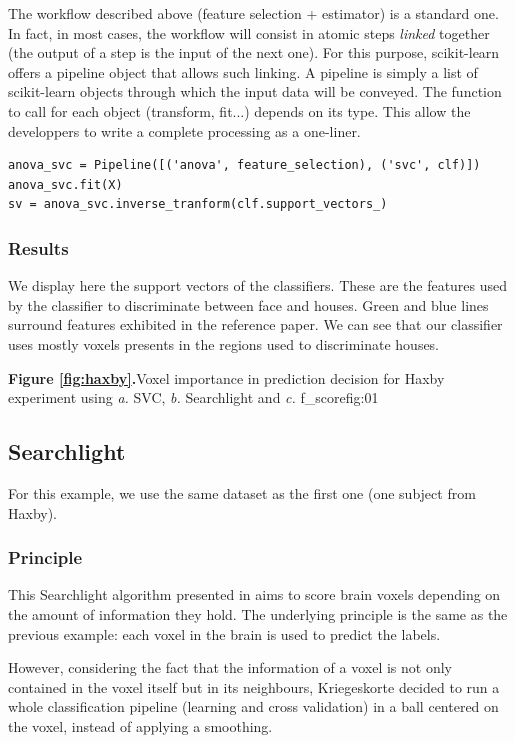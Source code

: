 \documentclass{frontiersSCNS} %
\begin{document}
The workflow described above (feature selection + estimator) is a standard one.
In fact, in most cases, the workflow will consist in atomic steps
\textit{linked} together (the output of a step is the input of the next one).
For this purpose, scikit-learn offers a pipeline object that allows such
linking. A pipeline is simply a list of scikit-learn objects through which the
input data will be conveyed. The function to call for each object (transform,
fit...) depends on its type.
This allow the developpers to write a complete processing as a one-liner.

\begin{lstlisting}
anova_svc = Pipeline([('anova', feature_selection), ('svc', clf)])
anova_svc.fit(X)
sv = anova_svc.inverse_tranform(clf.support_vectors_)
\end{lstlisting}

\subsubsection{Results}

We display here the support vectors of the classifiers. These are the features
used by the classifier to discriminate between face and houses. Green and blue
lines surround features exhibited in the reference paper. We can see that our
classifier uses mostly voxels presents in the regions used to discriminate
houses.

\textbf{Figure \ref{fig:haxby}.}{Voxel importance in prediction decision for Haxby experiment
using \textit{a.} SVC, \textit{b.} Searchlight and \textit{c.} f\_score}{fig:01}

\subsection{Searchlight}
\label{searchlight}
For this example, we use the same dataset as the first one (one subject from
Haxby).

\subsubsection{Principle}

This Searchlight algorithm presented in \cite{kriegeskorte2006} aims to score
brain voxels depending on the amount of information they hold. The underlying
principle is the same as the previous example: each voxel in the brain is used
to predict the labels.

However, considering the fact that the information of a voxel is not only
contained in the voxel itself but in its neighbours, Kriegeskorte decided to run
a whole classification pipeline (learning and cross validation) in a ball
centered on the voxel, instead of applying a smoothing.
\end{document}
